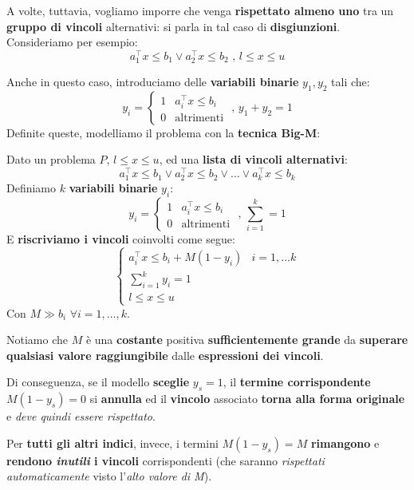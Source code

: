 A volte, tuttavia, vogliamo imporre che venga \textbf{rispettato almeno uno}
tra un \textbf{gruppo di vincoli} alternativi: si parla in tal caso di
\textbf{disgiunzioni}.
Consideriamo per esempio:
\[
    a_{1}^\top x \le b_{1} \lor a_{2}^\top x \le b_{2} \text{ , } l \le x \le u
\]

Anche in questo caso, introduciamo delle \textbf{variabili binarie} $y_{1},y_{2}$ tali che:
\[
    y_i = \begin{cases}
        1 & a_i^\top x \le b_i \\ 
        0 & \text{altrimenti}
    \end{cases} \text{ , } y_{1} + y_{2} = 1
\]
Definite queste, modelliamo il problema con la \textbf{tecnica Big-M}:

\begin{definition}[DISGIUNZIONI]
    Dato un problema $P$, $l\le x\le u$, ed 
    una \textbf{lista di vincoli alternativi}:
    \[
        a_{1}^\top x \le b_{1} \lor a_{2}^\top x \le b_{2}
        \lor \ldots \lor a_{k}^\top x \le b_{k}
    \] 
    Definiamo $k$ \textbf{variabili binarie} $y_i$:
    \[
    y_i = \begin{cases}
        1 & a_i^\top x \le b_i \\ 
        0 & \text{altrimenti}
    \end{cases} \text{ , } \sum_{i=1}^k = 1
    \] 
    E \textbf{riscriviamo i vincoli} coinvolti come segue:
    \[
        \begin{cases}
            a_i^\top x \le b_i + M(1-y_i) & i=1,\ldots k \\ 
            \sum_{i=1}^k y_i = 1 \\ 
            l \le x \le u
        \end{cases}
    \]
    Con $M\gg b_i$ $\forall i=1,\ldots, k$.
\end{definition}

Notiamo che $M$ è una \textbf{costante} positiva \textbf{sufficientemente grande} da
\textbf{superare qualsiasi valore raggiungibile} dalle \textbf{espressioni dei vincoli}.

\begin{remark}[BIG-M]
    Di conseguenza, se il modello \textbf{sceglie} $y_s=1$, il \textbf{termine corrispondente}
    $M(1-y_s)=0$ si \textbf{annulla} ed il \textbf{vincolo} associato 
    \textbf{torna alla forma originale} e \textit{deve quindi essere rispettato}.

    Per \textbf{tutti gli altri indici}, invece, i termini $M(1-y_s)=M$ \textbf{rimangono}
    e \textbf{rendono \textit{inutili} i vincoli} corrispondenti (che saranno 
    \textit{rispettati automaticamente} visto l'\textit{alto valore di M}).
\end{remark}

